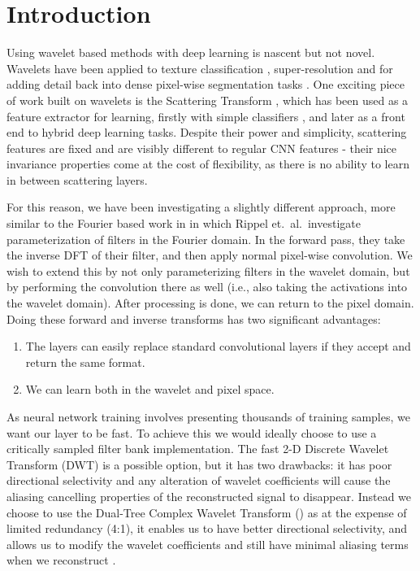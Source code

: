 \def \path {misc/dtcwt_gain}
\def \imgpath {\path/images}

\section{Introduction}\label{sec:intro}

Using wavelet based methods with deep learning is nascent but not novel.
Wavelets have been applied to texture classification \cite{fujieda_wavelet_2017,
sifre_combined_2012}, super-resolution \cite{guo_deep_2017} and for adding
detail back into dense pixel-wise segmentation tasks \cite{ma_detailed_2018}.
One exciting piece of work built on wavelets is the Scattering Transform
\cite{mallat_group_2012}, which has been used as a feature extractor for
learning, firstly with simple classifiers \cite{bruna_invariant_2013,
singh_scatternet_2017}, and later as a front end to hybrid deep learning
tasks\cite{oyallon_scaling_2017, singh_scatternet_2018}. Despite their power and
simplicity, scattering features are fixed and are visibly different to regular
CNN features \cite{cotter_visualizing_2017} - their nice invariance properties
come at the cost of flexibility, as there is no ability to learn in between
scattering layers. 

For this reason, we have been investigating a slightly different approach, more
similar to the Fourier based work in \cite{rippel_spectral_2015} in which Rippel
et.\ al.\ investigate parameterization of filters in the Fourier domain. In the
forward pass, they take the inverse DFT of their filter, and then apply normal
pixel-wise convolution. We wish to extend this by not only parameterizing
filters in the wavelet domain, but by performing the convolution there as well
(i.e., also taking the activations into the wavelet domain). After processing is
done, we can return to the pixel domain. Doing these forward and inverse
transforms has two significant advantages: 

\begin{enumerate}
  \item The layers can easily replace standard convolutional layers if they
    accept and return the same format.
  \item We can learn both in the wavelet and pixel space.
\end{enumerate}

As neural network training involves presenting thousands of training samples, we
want our layer to be fast. To achieve this we would ideally choose to use a
critically sampled filter bank implementation. The fast 2-D Discrete Wavelet
Transform (DWT) is a possible option, but it has two drawbacks: it has poor
directional selectivity and any alteration of wavelet coefficients will cause
the aliasing cancelling properties of the reconstructed signal to disappear.
Instead we choose to use the Dual-Tree Complex Wavelet Transform (\DTCWT)
\cite{selesnick_dual-tree_2005} as at the expense of limited redundancy (4:1),
it enables us to have better directional selectivity, and allows us to modify
the wavelet coefficients and still have minimal aliasing terms when we
reconstruct \cite{kingsbury_complex_2001}.

